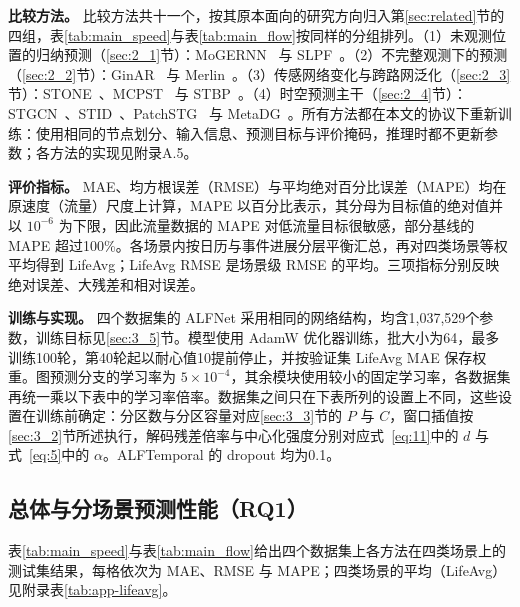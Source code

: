 \textbf{比较方法。} 比较方法共十一个，按其原本面向的研究方向归入第\ref{sec:related}节的四组，表\ref{tab:main_speed}与表\ref{tab:main_flow}按同样的分组排列。（1）未观测位置的归纳预测（\ref{sec:2_1}节）：MoGERNN~\citep{zhou2025mogernn} 与 SLPF~\citep{liu2025spatiotemporal}。（2）不完整观测下的预测（\ref{sec:2_2}节）：GinAR~\citep{yu2024ginar} 与 Merlin~\citep{yu2025merlin}。（3）传感网络变化与跨路网泛化（\ref{sec:2_3}节）：STONE~\citep{wang2024stone}、MCPST~\citep{fofanah2026pimcst} 与 STBP~\citep{liu2026general}。（4）时空预测主干（\ref{sec:2_4}节）：STGCN~\citep{yu2018spatio}、STID~\citep{shao2022spatial}、PatchSTG~\citep{fang2025efficient} 与 MetaDG~\citep{zou2026meta}。所有方法都在本文的协议下重新训练：使用相同的节点划分、输入信息、预测目标与评价掩码，推理时都不更新参数；各方法的实现见附录A.5。

\textbf{评价指标。} MAE、均方根误差（RMSE）与平均绝对百分比误差（MAPE）均在原速度（流量）尺度上计算，MAPE 以百分比表示，其分母为目标值的绝对值并以 $10^{-6}$ 为下限，因此流量数据的 MAPE 对低流量目标很敏感，部分基线的 MAPE 超过100\%。各场景内按日历与事件进展分层平衡汇总，再对四类场景等权平均得到 LifeAvg；LifeAvg RMSE 是场景级 RMSE 的平均。三项指标分别反映绝对误差、大残差和相对误差。

\textbf{训练与实现。} 四个数据集的 ALFNet 采用相同的网络结构，均含1,037,529个参数，训练目标见\ref{sec:3_5}节。模型使用 AdamW 优化器训练，批大小为64，最多训练100轮，第40轮起以耐心值10提前停止，并按验证集 LifeAvg MAE 保存权重。图预测分支的学习率为 $5\times10^{-4}$，其余模块使用较小的固定学习率，各数据集再统一乘以下表中的学习率倍率。数据集之间只在下表所列的设置上不同，这些设置在训练前确定：分区数与分区容量对应\ref{sec:3_3}节的 $P$ 与 $C$，窗口插值按\ref{sec:3_2}节所述执行，解码残差倍率与中心化强度分别对应式~\eqref{eq:11}中的 $d$ 与式~\eqref{eq:5}中的 $\alpha$。ALFTemporal 的 dropout 均为0.1。

\begin{center}
\small
\resizebox{\linewidth}{!}{}
\end{center}

\subsection{总体与分场景预测性能（RQ1）}\label{sec:4_2}

表\ref{tab:main_speed}与表\ref{tab:main_flow}给出四个数据集上各方法在四类场景上的测试集结果，每格依次为 MAE、RMSE 与 MAPE；四类场景的平均（LifeAvg）见附录表\ref{tab:app-lifeavg}。

\begin{table}[t]
\caption{\textbf{METR-LA 与 PEMS-BAY（速度）上的预测性能（测试集）。}每格为 MAE / RMSE / MAPE(\%)，数值为三个随机种子的均值，其后的小号数字为样本标准差。每个数据集的每项指标中，最优结果以红色加粗表示，次优结果以蓝色下划线表示，排名按未舍入的均值计算。比较方法按第\ref{sec:related}节的四个方向分组，括号内为发表的会议或期刊与年份。}
\label{tab:main_speed}
\centering
\small
\setlength{\tabcolsep}{3pt}
\resizebox{\linewidth}{!}{}
\end{table}

